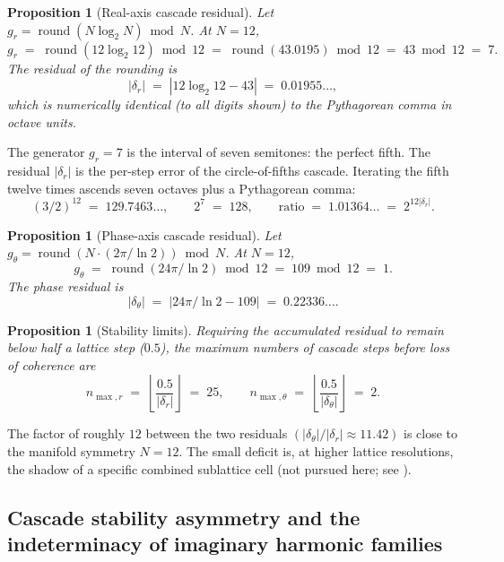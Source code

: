 \documentclass[11pt,a4paper]{article}
\newtheorem{proposition}[theorem]{Proposition}
\theoremstyle{definition}
\theoremstyle{remark}
\DeclareMathOperator{\round}{round}
\begin{document}
\begin{proposition}[Real-axis cascade residual]\label{prop:cascader}
Let $g_{r} = \round(N\log_{2}N)\bmod N$. At $N=12$,
\[
g_{r} \;=\; \round(12\log_{2}12)\bmod 12 \;=\; \round(43.0195)\bmod 12 \;=\; 43\bmod 12 \;=\; 7.
\]
The residual of the rounding is
\[
|\delta_{r}| \;=\; |12\log_{2}12 - 43| \;=\; 0.01955\ldots,
\]
which is numerically identical (to all digits shown) to the Pythagorean comma in octave units.
\end{proposition}

The generator $g_{r}=7$ is the interval of seven semitones: the perfect fifth. The residual $|\delta_{r}|$ is the per-step error of the circle-of-fifths cascade. Iterating the fifth twelve times ascends seven octaves plus a Pythagorean comma:
\[
(3/2)^{12} \;=\; 129.7463\ldots, \qquad 2^{7} \;=\; 128, \qquad \text{ratio} \;=\; 1.01364\ldots \;=\; 2^{12|\delta_{r}|}.
\]

\begin{proposition}[Phase-axis cascade residual]\label{prop:cascadetheta}
Let $g_{\theta} = \round(N\cdot (2\pi/\ln 2))\bmod N$. At $N=12$,
\[
g_{\theta} \;=\; \round(24\pi/\ln 2)\bmod 12 \;=\; 109\bmod 12 \;=\; 1.
\]
The phase residual is
\[
|\delta_{\theta}| \;=\; \bigl|24\pi/\ln 2 - 109\bigr| \;=\; 0.22336\ldots.
\]
\end{proposition}

\begin{proposition}[Stability limits]\label{prop:stability}
Requiring the accumulated residual to remain below half a lattice step ($0.5$), the maximum numbers of cascade steps before loss of coherence are
\[
n_{\max,r} \;=\; \left\lfloor\frac{0.5}{|\delta_{r}|}\right\rfloor \;=\; 25, \qquad
n_{\max,\theta} \;=\; \left\lfloor\frac{0.5}{|\delta_{\theta}|}\right\rfloor \;=\; 2.
\]
\end{proposition}

The factor of roughly $12$ between the two residuals $(|\delta_{\theta}|/|\delta_{r}| \approx 11.42)$ is close to the manifold symmetry $N=12$. The small deficit is, at higher lattice resolutions, the shadow of a specific combined sublattice cell (not pursued here; see \cite{Guide}).

\subsection{Cascade stability asymmetry and the indeterminacy of imaginary harmonic families}\label{subsec:cascade-stability-asymmetry}
\end{document}
